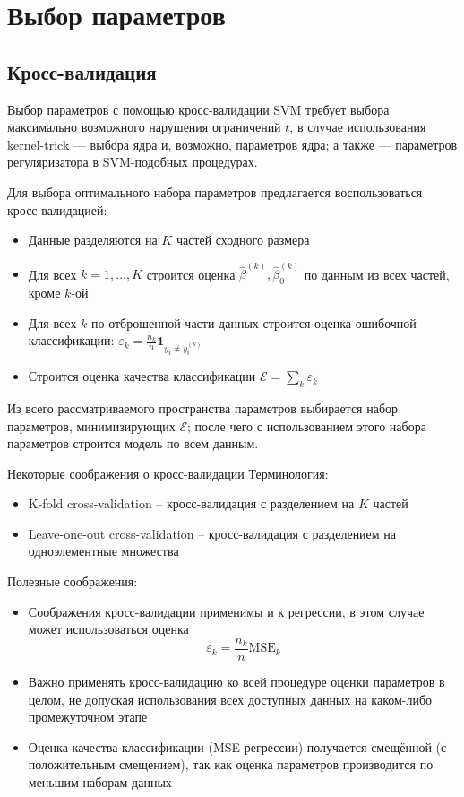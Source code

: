 \section{Выбор параметров}
\subsection{Кросс-валидация}
\begin{frame}{Выбор параметров с помощью кросс-валидации}
	SVM требует выбора максимально возможного нарушения
	ограничений $t$, в случае использования kernel-trick --- выбора ядра и, возможно,
	параметров ядра; а также --- параметров регуляризатора в SVM-подобных процедурах.


	Для выбора оптимального набора параметров предлагается воспользоваться кросс-валидацией:
	\begin{itemize}
		\item Данные разделяются на $K$ частей сходного размера
		\item Для всех $k=1,\dots,K$ строится оценка $\hat{\beta}^{(k)},\hat{\beta}_0^{(k)}$
			по данным из всех частей, кроме $k$-ой
		\item Для всех $k$ по отброшенной части данных строится оценка ошибочной классификации:
			$ \varepsilon_k = \frac{n_k}{n}\mathbf{1}_{y_i\neq y_i^{(k)}} $
		\item Строится оценка качества классификации $\mathcal{E}=\sum\limits_k \varepsilon_k$
	\end{itemize}

	Из всего рассматриваемого пространства параметров выбирается набор параметров,
	минимизирующих $\mathcal{E}$; после чего с использованием этого набора параметров
	строится модель по всем данным.
\end{frame}

\begin{frame}{Некоторые соображения о кросс-валидации}
	Терминология:
	\begin{itemize}
		\item K-fold cross-validation -- кросс-валидация с разделением на $K$ частей
		\item Leave-one-out cross-validation -- кросс-валидация с разделением на одноэлементные множества
	\end{itemize}

	Полезные соображения:
	\begin{itemize}
	
	\item Соображения кросс-валидации применимы и к регрессии, в этом случае может использоваться
	оценка
	$$\varepsilon_k=\frac{n_k}{n}\text{MSE}_k$$

    \item Важно применять кросс-валидацию ко всей процедуре оценки параметров в целом, не допуская
   использования всех доступных данных на каком-либо промежуточном этапе
    \item Оценка качества классификации (MSE регрессии) получается смещённой (с положительным смещением),
        так как оценка параметров производится по меньшим наборам данных
	\end{itemize}
\end{frame}

